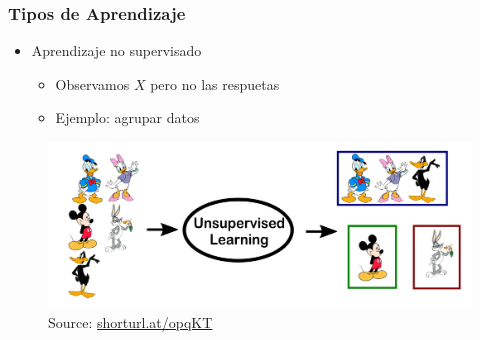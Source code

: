 \documentclass[
  shownotes,
  xcolor={svgnames},
  hyperref={colorlinks,citecolor=DarkBlue,linkcolor=DarkRed,urlcolor=DarkBlue}
  , aspectratio=169]{beamer}
\begin{document}
\begin{frame}
\frametitle{Tipos de Aprendizaje}

\begin{itemize}
  \item  Aprendizaje no supervisado
  \begin{itemize}
    \item Observamos $X$ pero no las respuetas
    \item Ejemplo: agrupar datos
  \end{itemize}
  \end{itemize}

\bigskip
    \begin{figure}[H] \centering

    \centering
    \includegraphics[scale=0.2]{figures/unsupevised}
  \\
  \tiny
  Source: \url{shorturl.at/opqKT}
\end{figure}


\end{frame}
\end{document}
